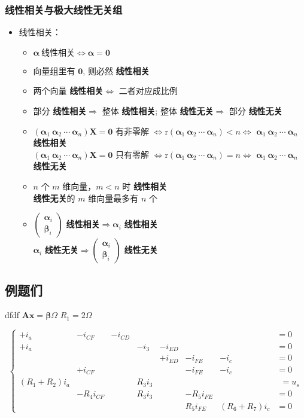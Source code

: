 \documentclass{ctexart}
\newcommand{\。}{．} %
\newcommand{\rr}{\mathrm{r}}
\newcommand{\al}{\bm{\alpha}}
\newcommand{\bt}{\bm{\beta}}
\newcommand{\xxxg}{\textbf{线性相关}}
\newcommand{\xxwg}{\textbf{线性无关}}
\newenvironment{kuang2}{
    \begin{tcolorbox}[colback=hlan!5!white, colframe=hlan, arc = 1mm]
    }
    {\end{tcolorbox}}
\theoremstyle{t} %
\begin{document}
\subsubsection{线性相关与极大线性无关组}

\begin{itemize}
    \item 线性相关：
    \begin{itemize}
        \item $\al\ \xxxg \Leftrightarrow \al = \bm{0}$
        \item 向量组里有 $\bm{0}$, 则必然 \xxxg
        \item 两个向量 \xxxg $\Leftrightarrow$ 二者对应成比例
        \item 部分 \xxxg $\Rightarrow$ 整体 \xxxg; 整体 \xxwg $\Rightarrow$ 部分 \xxwg
        \item $\left(\al_1\ \al_2\ \cdots\ \al_n \right)\bm{X} = \bm{0}$ 有非零解 $\Leftrightarrow \rr\left(\al_1\ \al_2\ \cdots\ \al_n\right) < n \Leftrightarrow$ $\al_1\ \al_2\ \cdots\ \al_n$ \xxxg \\
        $\left(\al_1\ \al_2\ \cdots\ \al_n \right)\bm{X} = \bm{0}$ 只有零解 $\Leftrightarrow \rr\left(\al_1\ \al_2\ \cdots\ \al_n\right) = n \Leftrightarrow$ $\al_1\ \al_2\ \cdots\ \al_n$ \xxwg
        \item $n$ 个 $m$ 维向量，$m < n$ 时 \xxxg \\
        \xxwg 的 $m$ 维向量最多有 $n$ 个
        \item $\begin{pmatrix}
            \al_i \\
            \bt_i
        \end{pmatrix}$ \xxxg $\Rightarrow \al_i$ \xxxg \\
        $\al_i$ \xxwg $\Rightarrow \begin{pmatrix}
            \al_i \\
            \bt_i
        \end{pmatrix}$ \xxwg
    \end{itemize}
\end{itemize}

\begin{kuang2}
    \section{例题们}
\end{kuang2}
dfdf
$\bm{A}\bm{x} = \bm{\beta}\Omega $
$R_1 = 2  \Omega$

\[\left\{
\begin{array}{cccccccc}
    +i_a &- i_{CF} &- i_{CD} & & & & & = 0\\
    +i_a & & &- i_3 & -i_{ED} & & & = 0 \\
     & & & & +i_{ED} & -i_{FE} & -i_c & = 0 \\
     &+i_{CF} & & & & -i_{FE} & -i_c & = 0 \\
    (R_1 + R_2)i_a & & & R_3i_3 & & & & \ \ = u_s \\
     & -R_4i_{CF} & & R_3i_3 & & -R_5i_{FE} & & = 0 \\
     & & & & & R_5i_{FE} & (R_6 + R_7)i_c & = 0
\end{array}\right.
\]
\end{document}
